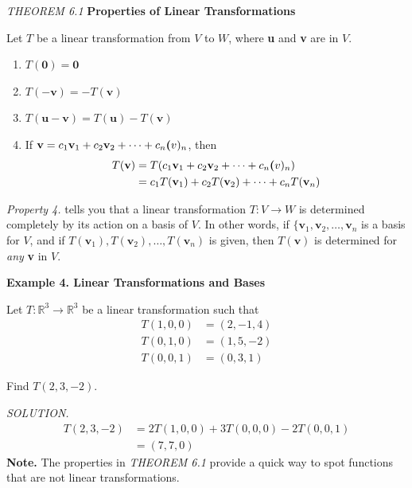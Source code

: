 \documentclass{article}
\newcommand\B{\textbf}
\newcommand\R{\mathbb{R}}
\begin{document}
    \begin{tcolorbox}[colback = {blue9}]
        \textit{THEOREM 6.1} \textbf{Properties of Linear Transformations}

        Let $T$ be a linear transformation from $V$ to $W$, where \B{u} and \B{v} are in $V$.
        \begin{enumerate}
            \item $T(\B{0}) = \B{0}$
            \item $T(-\B{v}) = -T(\B{v})$
            \item $T(\B{u} - \B{v}) = T(\B{u}) - T(\B{v})$
            \item If $\B{v} = c_1\B{v}_1 + c_2\B{v}_2 + \cdots + c_n\B(v)_n$, then
                \begin{equation*}
                    \begin{split}
                        T(\B{v}) &= T(c_1\B{v}_1 + c_2\B{v}_2 + \cdots + c_n\B(v)_n)\\
                                 &= c_1T(\B{v}_1) + c_2T(\B{v}_2) + \cdots + c_nT(\B{v}_n)
                    \end{split}
                \end{equation*}
        \end{enumerate}
    \end{tcolorbox}
    \textit{Property 4.} tells you that a linear transformation $T: V \to W$ is determined completely by its action on a basis of $V$.
    In other words, if $\{\B{v}_1, \B{v}_2, \dots, \B{v}_n$ is a basis for $V$, and if $T(\B{v}_1), T(\B{v}_2), \dots, T(\B{v}_n)$ is given,
    then $T(\B{v})$ is determined for \textit{any} \B{v} in $V$.

    \textbf{Example 4. \textcolor{blue5}{Linear Transformations and Bases}}

    Let $T: \R^3 \to \R^3$ be a linear transformation such that
    \begin{equation*}
        \begin{split}
            T(1,0,0) &= (2, -1, 4) \\
            T(0,1,0) &= (1, 5, -2)\\
            T(0,0,1) &= (0, 3, 1)
        \end{split}
    \end{equation*}

    Find $T(2, 3, -2)$.

    \textit{ \textcolor{blue5}{SOLUTION.} } 
    \begin{equation*}
        \begin{split}
            T(2,3,-2) &= 2T(1,0,0) + 3T(0,0,0) -2T(0,0,1) \\
                      &= (7,7,0)
        \end{split}
    \end{equation*}
    \textbf{Note.} The properties in \textit{THEOREM 6.1} provide a quick way to spot functions that are not linear transformations.
\end{document}
